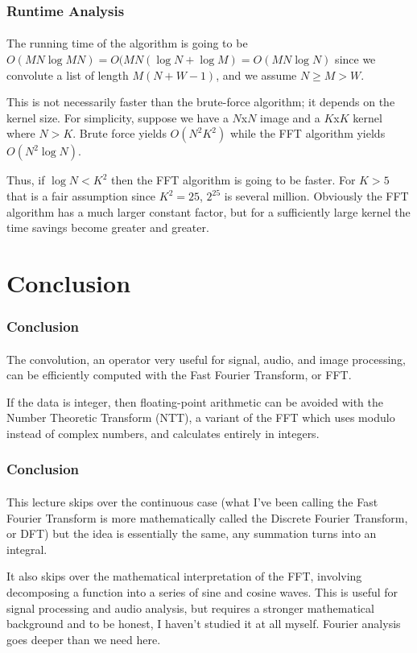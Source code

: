 \documentclass[11pt,handout]{beamer}             %
\begin{document}
\begin{frame}
\frametitle{Runtime Analysis}
\framesubtitle{}
The running time of the algorithm is going to be
\( O(MN \log MN) = O(MN(\log N + \log M) = O(MN \log N) \) since we convolute 
a list of length \( M(N + W - 1) \), and we assume \( N \geq M > W \). \pause

This is not necessarily faster than the brute-force algorithm;
it depends on the kernel size. For simplicity, suppose we have a \( N \)x\( N \)
image and a \( K \)x\( K \) kernel where \( N > K \). Brute force yields
\( O(N^2 K^2) \) while the FFT algorithm yields \( O(N^2 \log N) \). \pause

Thus, if \( \log N < K^2 \) then the FFT algorithm is going to be faster.
For \( K > 5 \) that is a fair assumption since \( K^2 = 25 \), \( 2^{25} \)
is several million. Obviously the FFT algorithm has a much larger constant
factor, but for a sufficiently large kernel the time savings become greater
and greater.
\end{frame}

\section{Conclusion}

\begin{frame}
\frametitle{Conclusion}
\framesubtitle{}
The convolution, an operator very useful for signal, audio, and image
processing, can be efficiently computed with the Fast Fourier Transform, or FFT.
\pause

If the data is integer, then floating-point arithmetic can be avoided with the
Number Theoretic Transform (NTT), a variant of the FFT which uses modulo
instead of complex numbers, and calculates entirely in integers.
\end{frame}

\begin{frame}
\frametitle{Conclusion}
\framesubtitle{}
This lecture skips over the continuous case (what I've been calling the 
Fast Fourier Transform is more mathematically called the
\alert{Discrete Fourier Transform}, or DFT) but the idea is essentially the
same, any summation turns into an integral. \pause

It also skips over the mathematical interpretation of the FFT,
involving decomposing a function into a series of sine and cosine waves.
This is useful for signal processing and audio analysis,
but requires a stronger mathematical background and to be honest, I haven't
studied it at all myself. Fourier analysis goes deeper than we need here. 
\end{frame}
\end{document}
